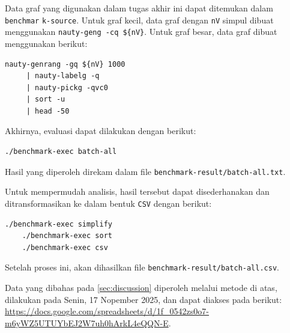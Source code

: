 Data graf yang digunakan dalam tugas akhir ini dapat ditemukan dalam  \verb`benchmar` \verb`k-source`. Untuk graf kecil, data graf dengan \verb`nV` simpul dibuat menggunakan  \verb`nauty-geng -cq ${nV}`. Untuk graf besar, data graf dibuat menggunakan  berikut:
\vspace{-1.375\baselineskip}
\begin{Verbatim}[gobble=1, xleftmargin=2em]
	nauty-genrang -gq ${nV} 1000
	 | nauty-labelg -q
	 | nauty-pickg -qvc0
	 | sort -u
	 | head -50
\end{Verbatim}
\vspace{-.375\baselineskip}
Akhirnya, evaluasi dapat dilakukan dengan  berikut:
\vspace{-.375\baselineskip}
\begin{Verbatim}[gobble=1, xleftmargin=2em]
	./benchmark-exec batch-all
\end{Verbatim}
\vspace{-.375\baselineskip}
Hasil yang diperoleh direkam dalam file \verb`benchmark-result/batch-all.txt`.

Untuk mempermudah analisis, hasil tersebut dapat disederhanakan dan ditransformasikan ke dalam bentuk \verb`CSV` dengan  berikut:
\vspace{-.375\baselineskip}
\begin{Verbatim}[gobble=1, xleftmargin=2em]
	./benchmark-exec simplify
	./benchmark-exec sort
	./benchmark-exec csv
\end{Verbatim}
\vspace{-.375\baselineskip}
Setelah proses ini, akan dihasilkan file \verb`benchmark-result/batch-all.csv`.

Data yang dibahas pada \autoref{sec:discussion} diperoleh melalui metode di atas, dilakukan pada Senin, 17 Nopember 2025, dan dapat diakses pada  berikut: \url{https://docs.google.com/spreadsheets/d/1f_0542zs0o7-m6yWZ5UTUYbEJ2W7uh0hArkL4eQQN-E}.
